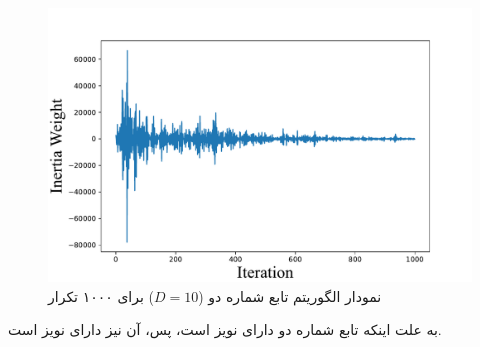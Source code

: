 \begin{figure}[H]\label{fig:ring}
	\caption{نمودار  الگوریتم  تابع شماره دو ($D=10$) برای ۱۰۰۰ تکرار } 
	\centering 
	\includegraphics[width=16cm]{../Figure/Q1/PSO_II_inertia_weight} 
\end{figure}

به علت اینکه تابع شماره دو دارای نویز است، پس، 
آن نیز دارای نویز است.

